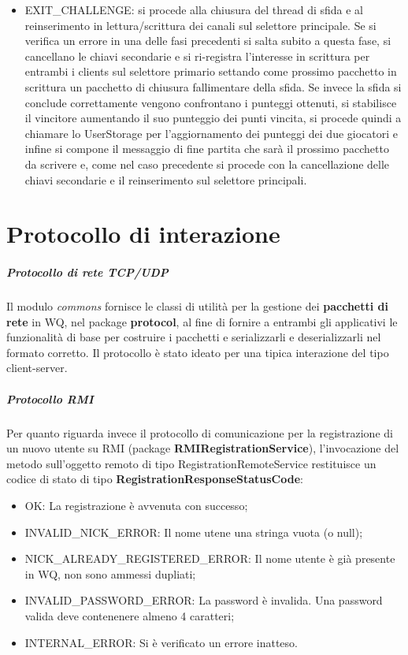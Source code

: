\documentclass{article}
\begin{document}
\begin{itemize}
        \item EXIT\_CHALLENGE: si procede alla chiusura del thread di sfida e al reinserimento in lettura/scrittura dei canali sul selettore principale. Se si verifica un errore in una delle fasi precedenti si salta subito a questa fase, si cancellano le chiavi secondarie e si ri-registra l'interesse in scrittura per entrambi i clients sul selettore primario settando come prossimo pacchetto in scrittura un pacchetto di chiusura fallimentare della sfida. Se invece la sfida si conclude correttamente vengono confrontano i punteggi ottenuti, si stabilisce il vincitore aumentando il suo punteggio dei punti vincita, si procede quindi a chiamare lo UserStorage per l'aggiornamento dei punteggi dei due giocatori e infine si compone il messaggio di fine partita che sarà il prossimo pacchetto da scrivere e, come nel caso precedente si procede con la cancellazione delle chiavi secondarie e il reinserimento sul selettore principali.
    \end{itemize}



    \section{Protocollo di interazione}
    \label{protocol}
    \subparagraph{Protocollo di rete TCP/UDP} Il modulo \textit{commons} fornisce le classi di utilità per la gestione dei \textbf{pacchetti di rete} in WQ, nel package \textbf{protocol}, al fine di fornire a entrambi gli applicativi le funzionalità di base per costruire i pacchetti e serializzarli e deserializzarli nel formato corretto. Il protocollo è stato ideato per una tipica interazione del tipo client-server.
    \subparagraph{Protocollo RMI} Per quanto riguarda invece il protocollo di comunicazione per la registrazione di un nuovo utente su RMI (package \textbf{RMIRegistrationService}), l'invocazione del metodo sull'oggetto remoto di tipo RegistrationRemoteService restituisce un codice di stato di tipo \textbf{RegistrationResponseStatusCode}:
    \begin{itemize}
        \item OK: La registrazione è avvenuta con successo;
        \item INVALID\_NICK\_ERROR: Il nome utene una stringa vuota (o null);
        \item NICK\_ALREADY\_REGISTERED\_ERROR: Il nome utente è già presente in WQ, non sono ammessi dupliati;
        \item INVALID\_PASSWORD\_ERROR: La password è invalida. Una password valida deve contenenere almeno 4 caratteri;
        \item INTERNAL\_ERROR: Si è verificato un errore inatteso.
    \end{itemize}
\end{document}
